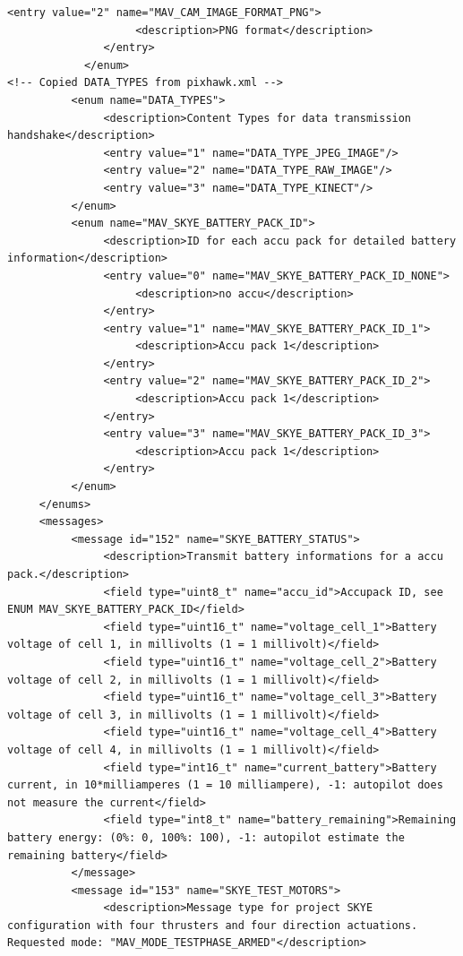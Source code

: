 \begin{lstlisting}[captionpos=b, caption="Definition of \textsc{Skye} specific Mavlink messages", label=app_xml]
               <entry value="2" name="MAV_CAM_IMAGE_FORMAT_PNG">
                    <description>PNG format</description>
               </entry>
	        </enum>
<!-- Copied DATA_TYPES from pixhawk.xml -->
          <enum name="DATA_TYPES">
               <description>Content Types for data transmission handshake</description>
               <entry value="1" name="DATA_TYPE_JPEG_IMAGE"/>
               <entry value="2" name="DATA_TYPE_RAW_IMAGE"/>
               <entry value="3" name="DATA_TYPE_KINECT"/>
          </enum>
          <enum name="MAV_SKYE_BATTERY_PACK_ID">
               <description>ID for each accu pack for detailed battery information</description>
               <entry value="0" name="MAV_SKYE_BATTERY_PACK_ID_NONE">
                    <description>no accu</description>
               </entry>
               <entry value="1" name="MAV_SKYE_BATTERY_PACK_ID_1">
                    <description>Accu pack 1</description>
               </entry>
               <entry value="2" name="MAV_SKYE_BATTERY_PACK_ID_2">
                    <description>Accu pack 1</description>
               </entry>
               <entry value="3" name="MAV_SKYE_BATTERY_PACK_ID_3">
                    <description>Accu pack 1</description>
               </entry>
          </enum>
     </enums>
     <messages>
          <message id="152" name="SKYE_BATTERY_STATUS">
               <description>Transmit battery informations for a accu pack.</description>
               <field type="uint8_t" name="accu_id">Accupack ID, see ENUM MAV_SKYE_BATTERY_PACK_ID</field>
               <field type="uint16_t" name="voltage_cell_1">Battery voltage of cell 1, in millivolts (1 = 1 millivolt)</field>
               <field type="uint16_t" name="voltage_cell_2">Battery voltage of cell 2, in millivolts (1 = 1 millivolt)</field>
               <field type="uint16_t" name="voltage_cell_3">Battery voltage of cell 3, in millivolts (1 = 1 millivolt)</field>
               <field type="uint16_t" name="voltage_cell_4">Battery voltage of cell 4, in millivolts (1 = 1 millivolt)</field>
               <field type="int16_t" name="current_battery">Battery current, in 10*milliamperes (1 = 10 milliampere), -1: autopilot does not measure the current</field>
               <field type="int8_t" name="battery_remaining">Remaining battery energy: (0%: 0, 100%: 100), -1: autopilot estimate the remaining battery</field>
          </message>
          <message id="153" name="SKYE_TEST_MOTORS">
               <description>Message type for project SKYE configuration with four thrusters and four direction actuations. Requested mode: "MAV_MODE_TESTPHASE_ARMED"</description>

\end{lstlisting}
